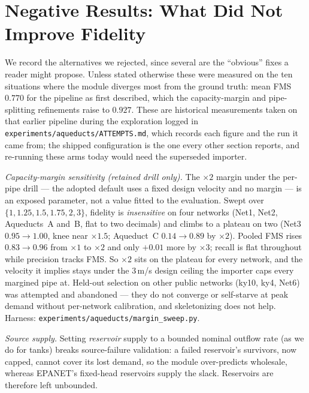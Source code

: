 \documentclass[11pt]{article}
\begin{document}
\section{Negative Results: What Did Not Improve Fidelity}\label{app:negative}
We record the alternatives we rejected, since several are the ``obvious'' fixes a
reader might propose. Unless stated otherwise these were measured on the ten situations
where the module diverges most from the ground truth: mean FMS $0.770$ for the pipeline
as first described, which the capacity-margin and pipe-splitting refinements raise to
$0.927$. These are historical measurements taken on that earlier pipeline during the
exploration logged in \texttt{experiments/aqueducts/ATTEMPTS.md}, which records each
figure and the run it came from; the shipped configuration is the one every other
section reports, and re-running these arms today would need the superseded importer.

\emph{Capacity-margin sensitivity (retained drill only).} The $\times 2$ margin
under the per-pipe drill --- the adopted default uses a fixed design velocity and
no margin --- is an exposed parameter, not a value fitted to the evaluation.
Swept over $\{1, 1.25, 1.5, 1.75, 2, 3\}$, fidelity is \emph{insensitive} on four
networks (Net1, Net2, Aqueducts~A and~B, flat to two decimals) and climbs to a
plateau on two (Net3 $0.95\!\to\!1.00$, knee near $\times 1.5$; Aqueduct~C
$0.14\!\to\!0.89$ by $\times 2$). Pooled FMS rises $0.83\!\to\!0.96$ from
$\times 1$ to $\times 2$ and only $+0.01$ more by $\times 3$; recall is flat
throughout while precision tracks FMS. So $\times 2$ sits on the plateau for
every network, and the velocity it implies stays under the $3$\,m/s design ceiling the
importer caps every margined pipe at. Held-out selection on other
public networks (ky10, ky4, Net6) was attempted and abandoned --- they do not
converge or self-starve at peak demand without per-network calibration, and
skeletonizing does not help. Harness:
\texttt{experiments/aqueducts/margin\_sweep.py}.

\emph{Source supply.} Setting \emph{reservoir} supply to a bounded nominal outflow rate
(as we do for tanks) breaks source-failure validation: a failed reservoir's
survivors, now capped, cannot cover its lost demand, so the module over-predicts
wholesale, whereas EPANET's fixed-head reservoirs supply the slack. Reservoirs
are therefore left unbounded.
\end{document}
